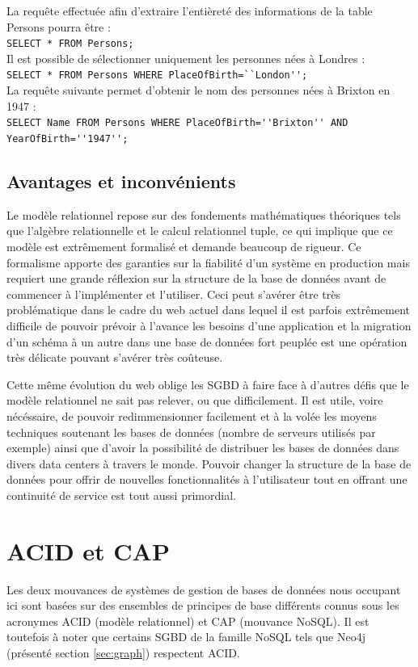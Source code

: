 \documentclass[11pt]{article}
\begin{document}
La requête effectuée afin d'extraire l'entièreté des informations de la table Persons pourra être : \\
\verb|SELECT * FROM Persons;| \\
Il est possible de sélectionner uniquement les personnes nées à Londres : \\
\verb|SELECT * FROM Persons WHERE PlaceOfBirth=``London'';| \\
La requête suivante permet d'obtenir le nom des personnes nées à Brixton en 1947 : \\
\verb|SELECT Name FROM Persons WHERE PlaceOfBirth=''Brixton'' AND YearOfBirth=''1947'';|
\subsection{Avantages et inconvénients}
Le modèle relationnel repose sur des fondements mathématiques théoriques tels que l'algèbre relationnelle et le calcul relationnel tuple, ce qui implique que ce modèle est extrêmement formalisé et demande beaucoup de rigueur. Ce formalisme apporte des garanties sur la fiabilité d'un système en production mais requiert une grande réflexion sur la structure de la base de données avant de commencer à l'implémenter et l'utiliser. Ceci peut s'avérer être très problématique dans le cadre du web actuel dans lequel il est parfois extrêmement difficile de pouvoir prévoir à l'avance les besoins d'une application et la migration d'un schéma à un autre dans une base de données fort peuplée est une opération très délicate pouvant s'avérer très coûteuse.

Cette même évolution du web oblige les SGBD à faire face à d'autres défis que le modèle relationnel ne sait pas relever, ou que difficilement. Il est utile, voire nécéssaire, de pouvoir redimmensionner facilement et à la volée les moyens techniques soutenant les bases de données (nombre de serveurs utilisés par exemple) ainsi que d'avoir la possibilité de distribuer les bases de données dans divers data centers à travers le monde. Pouvoir changer la structure de la base de données pour offrir de nouvelles fonctionnalités à l'utilisateur tout en offrant une continuité de service est tout aussi primordial.

\section{ACID et CAP}
Les deux mouvances de systèmes de gestion de bases de données nous occupant ici sont basées sur des ensembles de principes de base différents connus sous les acronymes ACID (modèle relationnel) et CAP (mouvance NoSQL). Il est toutefois à noter que certains SGBD de la famille NoSQL tels que Neo4j (présenté section \ref{sec:graph}) respectent ACID.
\end{document}

